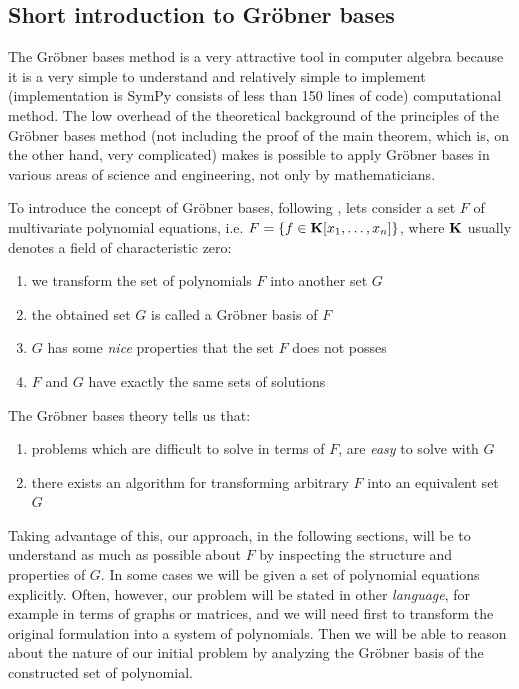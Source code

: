 \subsection{Short introduction to Gröbner bases}

The Gröbner bases method is a very attractive tool in computer algebra because it is a very
simple to understand and relatively simple to implement (implementation is SymPy consists of less
than 150 lines of code) computational method. The low overhead of the theoretical background of
the principles of the Gröbner bases method (not including the proof of the main theorem, which
is, on the other hand, very complicated) makes is possible to apply Gröbner bases in various
areas of science and engineering, not only by mathematicians.

To introduce the concept of Gröbner bases, following \cite{Buchberger2001systems}, lets consider
a set $F$ of multivariate polynomial equations, i.e. $F = \{ f \in \mathbf{K}[x_1, \ldots, x_n] \}$, where $\mathbf{K}$ usually
denotes a field of characteristic zero:
\begin{enumerate}
\item {}
we transform the set of polynomials $F$ into another set $G$

\item {}
the obtained set $G$ is called a Gröbner basis of $F$

\item {}
$G$ has some \emph{nice} properties that the set $F$ does not posses

\item {}
$F$ and $G$ have exactly the same sets of solutions

\end{enumerate}

The Gröbner bases theory tells us that:
\begin{enumerate}
\item {}
problems which are difficult to solve in terms of $F$, are \emph{easy} to solve with $G$

\item {}
there exists an algorithm for transforming arbitrary $F$ into an equivalent set $G$

\end{enumerate}

Taking advantage of this, our approach, in the following sections, will be to understand as much as
possible about $F$ by inspecting the structure and properties of $G$. In some cases we will be given a
set of polynomial equations explicitly. Often, however, our problem will be stated in other \emph{language},
for example in terms of graphs or matrices, and we will need first to transform the original formulation
into a system of polynomials. Then we will be able to reason about the nature of our initial problem by
analyzing the Gröbner basis of the constructed set of polynomial.
\hypertarget{gb-construct}{}

